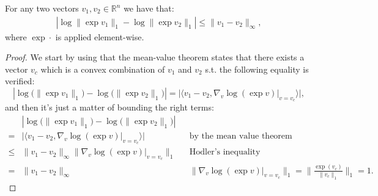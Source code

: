 \begin{claim}
    \label{claim:infinity_log_exp}
    For any two vectors $v_1,v_2 \in \mathbb{R}^n$ we have that:
    \begin{align*}
        |\log \| \exp v_1 \|_1 -\log \| \exp v_2 \|_1| \leq \|v_1-v_2\|_\infty,
    \end{align*}
    where $\exp \cdot$ is applied element-wise.
    \begin{proof}
        We start by using that the mean-value theorem states that there exists a vector $v_c$ which is a convex combination of $v_1$ and $v_2$ s.t. the following equality is verified:
        \[
            | \log \bigl( \| \exp v_1 \|_1 \bigr) - \log \bigl( \| \exp v_2 \|_1 \bigr)  | 
            =  
            | \big\langle 
            v_1 - v_2,
            \nabla_v \log (\exp v) |_{v = v_c}
            \big\rangle |,
        \]
        and then it's just a matter of bounding the right terms:
        \begin{align*}
            &| \log \bigl( \| \exp v_1 \|_1 \bigr) - \log \bigl( \| \exp v_2 \|_1 \bigr)  | \\
            =  &
            | \big\langle 
            v_1 - v_2,
            \nabla_v \log (\exp v) |_{v = v_c}
            \big\rangle | && \text{by the mean value theorem}
            \\
            \leq  & 
            \| v_1 - v_2 \|_\infty \| \nabla_v \log (\exp v) |_{v = v_c} \|_1
            && \text{Hodler's inequality} 
            \\
            =  & 
            \| v_1 - v_2 \|_\infty
            &&
            \| \nabla_v \log (\exp v) |_{v = v_c} \|_1 =
            \Bigg\|\frac{\exp(v_c)}{\|v_c\|_1}\Bigg\|_1 = 1.
        \end{align*}
    \end{proof}
\end{claim}

